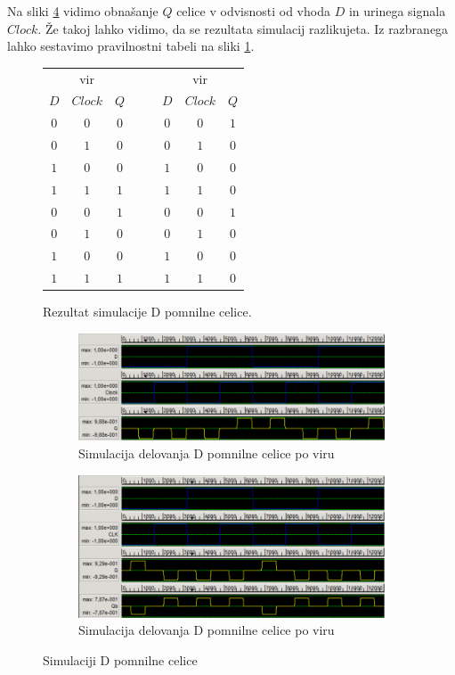 \documentclass[a4paper, 11pt]{article}
\begin{document}
Na sliki \ref{fig-d-sim} vidimo obnašanje $Q$ celice v odvisnosti od vhoda $D$ in urinega signala $Clock$. Že takoj lahko vidimo, da se rezultata simulacij razlikujeta. Iz razbranega lahko sestavimo pravilnostni tabeli na sliki \ref{tab-d-sim}.
\begin{figure}[h!]
	\centering
	\small
	\begin{tabular}{cc|cccc|c}
	\multicolumn{3}{c}{vir \cite{quantum_dot}} & $\quad$ & \multicolumn{3}{c}{vir \cite{a_novel_approach}}\\
	$D$ & $Clock$ & $Q$ && $D$ & $Clock$ & $Q$ \\
	\cline{1-3} \cline{5-7}
	$0$ & $0$ & $0$ && $0$ & $0$ & $1$\\
	$0$ & $1$ & $0$ && $0$ & $1$ & $0$\\
	$1$ & $0$ & $0$ && $1$ & $0$ & $0$\\
	$1$ & $1$ & $1$ && $1$ & $1$ & $0$\\
	\cline{1-3} \cline{5-7}
	$0$ & $0$ & $1$ && $0$ & $0$ & $1$\\
	$0$ & $1$ & $0$ && $0$ & $1$ & $0$\\
	$1$ & $0$ & $0$ && $1$ & $0$ & $0$\\
	$1$ & $1$ & $1$ && $1$ & $1$ & $0$\\
	\end{tabular}
	\caption{Rezultat simulacije D pomnilne celice.}
	\label{tab-d-sim}
\end{figure}


\begin{figure}[h!]
	\begin{subfigure}[b]{\textwidth}
	\includegraphics[width=\textwidth]{../img/vir_4/sim_d.png}
	\caption{Simulacija delovanja D pomnilne celice po viru \cite{quantum_dot}}
	\label{fig-d-1-sim}
	\end{subfigure}
	\begin{subfigure}[b]{\textwidth}
	\includegraphics[width=\textwidth]{../img/vir_5/sim_d.png}
	\caption{Simulacija delovanja D pomnilne celice po viru \cite{a_novel_approach}}
	\label{fig-d-2-sim}
	\end{subfigure}
	\caption{Simulaciji D pomnilne celice}
	\label{fig-d-sim}
\end{figure}
\end{document}
